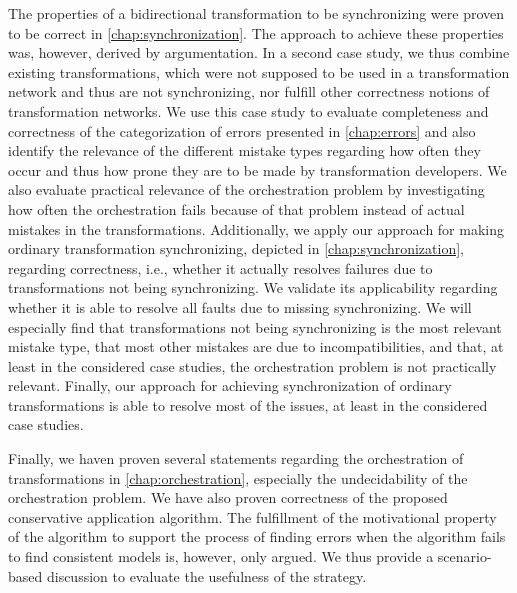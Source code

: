 The properties of a bidirectional transformation to be synchronizing were proven to be correct in \autoref{chap:synchronization}.
The approach to achieve these properties was, however, derived by argumentation.
In a second case study, we thus combine existing transformations, which were not supposed to be used in a transformation network and thus are not synchronizing, nor fulfill other correctness notions of transformation networks.
We use this case study to evaluate completeness and correctness of the categorization of errors presented in \autoref{chap:errors} and also identify the relevance of the different mistake types regarding how often they occur and thus how prone they are to be made by transformation developers.
We also evaluate practical relevance of the orchestration problem by investigating how often the orchestration fails because of that problem instead of actual mistakes in the transformations.
Additionally, we apply our approach for making ordinary transformation synchronizing, depicted in \autoref{chap:synchronization}, regarding correctness, i.e., whether it actually resolves failures due to transformations not being synchronizing. %
We validate its applicability regarding whether it is able to resolve all faults due to missing synchronizing.
We will especially find that transformations not being synchronizing is the most relevant mistake type, that most other mistakes are due to incompatibilities, and that, at least in the considered case studies, the orchestration problem is not practically relevant.
Finally, our approach for achieving synchronization of ordinary transformations is able to resolve most of the issues, at least in the considered case studies.

Finally, we haven proven several statements regarding the orchestration of transformations in \autoref{chap:orchestration}, especially the undecidability of the orchestration problem.
We have also proven correctness of the proposed conservative application algorithm.
The fulfillment of the motivational property of the algorithm to support the process of finding errors when the algorithm fails to find consistent models is, however, only argued.
We thus provide a scenario-based discussion to evaluate the usefulness of the strategy.


